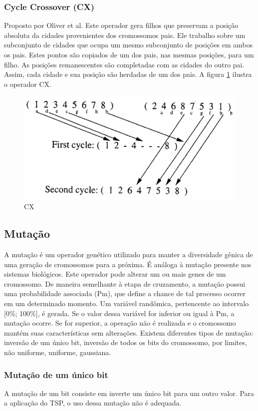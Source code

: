 \documentclass[twoside]{article}
\begin{document}
\begin{multicols}{2}
\subsubsection{Cycle Crossover (CX)}
Proposto por Oliver et al. Este operador gera filhos que preservam a posição absoluta da cidades provenientes dos cromossomos pais. Ele trabalho sobre um subconjunto de cidades que ocupa um mesmo subconjunto de posições em ambos os pais. Estes pontos são copiados de um dos pais, nas mesmas posições, para um filho. As posições remanescentes são completadas com as cidades do outro pai. Assim, cada cidade e sua posição são herdadas de um dos pais. A figura \ref{fig:cx} ilustra o operador CX.
\begin{figure}[H]
\label{fig:cx}
  \caption{CX}
  \centering
    \includegraphics[scale = 0.55]{crossover_cx.png}
\end{figure}

\subsection{Mutação}
A mutação é um operador genético utilizado para manter a diversidade gênica de uma geração de cromossomos para a próxima. É análoga à mutação presente nos sistemas biológicos. Este operador pode alterar um ou mais genes de um cromossomo. De maneira semelhante à etapa de cruzamento, a mutação possui uma probabilidade associada (Pm), que define a chance de tal processo ocorrer em um determinado momento. Um variável randômica, pertencente ao intervalo [0\%; 100\%], é gerada. Se o valor dessa variável for inferior ou igual à Pm, a mutação ocorre. Se for superior, a operação não é realizada e o cromossomo mantém suas características sem alterações. Existem diferentes tipos de mutação: inversão de um único bit, inversão de todos os bits do cromossomo, por limites, não uniforme, uniforme, gaussiana.

\subsubsection{Mutação de um único bit}
A mutação de um bit consiste em inverte um único bit para um outro valor. Para a aplicação do TSP, o uso dessa mutação não é adequada.


\end{multicols}
\end{document}
